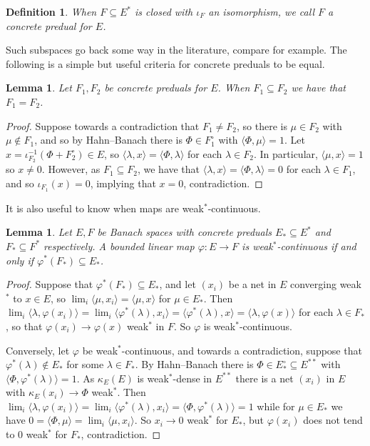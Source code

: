 \documentclass[a4paper,11pt]{article}
\theoremstyle{plain}
\newtheorem{lemma}[proposition]{Lemma}
\newtheorem{definition}[proposition]{Definition}
\theoremstyle{remark}
\newcommand{\ip}[2]{{\langle {#1} , {#2} \rangle}}
\begin{document}
\begin{definition}
When $F \subseteq E^*$ is closed with $\iota_F$ an isomorphism, we call $F$ a \emph{concrete predual} for $E$.
\end{definition}

Such subspaces go back some way in the literature, compare \cite{palmer_arens_mult_Wstar} for example.  The following is a simple but useful criteria for concrete preduals to be equal.

\begin{lemma}\label{lem:when_conc_preduals_equal}
Let $F_1, F_2$ be concrete preduals for $E$.  When $F_1 \subseteq F_2$ we have that $F_1 = F_2$.
\end{lemma}
\begin{proof}
Suppose towards a contradiction that $F_1 \not= F_2$, so there is $\mu\in F_2$ with $\mu\not\in F_1$, and so by Hahn--Banach there is $\Phi\in F_1^\circ$ with $\ip{\Phi}{\mu} = 1$.  Let $x = \iota_{F_2}^{-1}(\Phi + F_2^\circ) \in E$, so $\ip{\lambda}{x} = \ip{\Phi}{\lambda}$ for each $\lambda\in F_2$.  In particular, $\ip{\mu}{x}=1$ so $x\not=0$.  However, as $F_1 \subseteq F_2$, we have that $\ip{\lambda}{x} = \ip{\Phi}{\lambda} = 0$ for each $\lambda\in F_1$, and so $\iota_{F_1}(x)=0$, implying that $x=0$, contradiction.
\end{proof}

It is also useful to know when maps are weak$^*$-continuous.

\begin{lemma}\label{lem:conc_when_wstar_cts}
Let $E,F$ be Banach spaces with concrete preduals $E_* \subseteq E^*$ and $F_* \subseteq F^*$ respectively.  A bounded linear map $\varphi \colon E \to F$ is weak$^*$-continuous if and only if $\varphi^*(F_*) \subseteq E_*$.
\end{lemma}
\begin{proof}
Suppose that $\varphi^*(F_*) \subseteq E_*$, and let $(x_i)$ be a net in $E$ converging weak$^*$ to $x\in E$, so $\lim_i \ip{\mu}{x_i} = \ip{\mu}{x}$ for $\mu\in E_*$.  Then $\lim_i \ip{\lambda}{\varphi(x_i)} = \lim_i \ip{\varphi^*(\lambda)}{x_i} = \ip{\varphi^*(\lambda)}{x} = \ip{\lambda}{\varphi(x)}$ for each $\lambda \in F_*$, so that $\varphi(x_i) \to \varphi(x)$ weak$^*$ in $F$.  So $\varphi$ is weak$^*$-continuous.

Conversely, let $\varphi$ be weak$^*$-continuous, and towards a contradiction, suppose that $\varphi^*(\lambda) \not \in E_*$ for some $\lambda\in F_*$.  By Hahn--Banach there is $\Phi\in E_*^\circ \subseteq E^{**}$ with $\ip{\Phi}{\varphi^*(\lambda)} = 1$.  As $\kappa_E(E)$ is weak$^*$-dense in $E^{**}$ there is a net $(x_i)$ in $E$ with $\kappa_E(x_i) \to \Phi$ weak$^*$.  Then $\lim_i \ip{\lambda}{\varphi(x_i)} = \lim_i \ip{\varphi^*(\lambda)}{x_i} = \ip{\Phi}{\varphi^*(\lambda)} = 1$ while for $\mu\in E_*$ we have $0 = \ip{\Phi}{\mu} = \lim_i \ip{\mu}{x_i}$.  So $x_i \to 0$ weak$^*$ for $E_*$, but $\varphi(x_i)$ does not tend to $0$ weak$^*$ for $F_*$, contradiction.
\end{proof}
\end{document}
